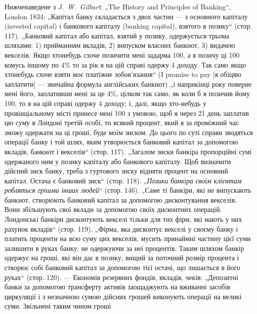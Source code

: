 Нижченаведене з \emph{J.~W.~Gilbart}: „The History and Principles of Banking“,
London 1834: „Капітал банку складається з двох частин — з основного капіталу
(invested capital) і банкового капіталу (banking capital), взятого в позику“ (стор. 117).
„Банковий капітал або капітал, взятий у позику, одержується трьома шляхами:
1) прийманням вкладів, 2) випуском власних банкнот, 3) видачею векселів. Якщо
хтонебудь схоче позичити мені задарма 100, а я позичу ці
100 комусь іншому по 4\% то за рік я на цій справі одержу
4 доходу. Так само якщо хтонебудь схоче взяти моє платіжне
зобов’язання“ (I promise to pay [я обіцяю заплатити] — звичайна формула англійських банкнот) „і
наприкінці року поверне мені його, заплативши мені за це 4\%, цілком так само, як коли б я позичив
йому 100, то я на цій справі одержу 4 доходу; і, далі, якщо
хто-небудь у провінціальному місті принесе мені 100 з умовою, щоб я через 21 день
заплатив цю суму в Лондоні третій особі, то всякий процент, який я за проміжний час зможу одержати
на ці гроші, буде моїм зиском. До цього по суті справи зводяться операції банку і той шлях, яким
утворюється банковий капітал за допомогою вкладів, банкнот і векселів“ (стор. 117). „Загалом зиски
банкіра пропорційні сумі одержаного ним у позику капіталу або банкового капіталу. Щоб визначити
дійсний зиск банку, треба з гуртового зиску відняти процент на основний капітал. Остача є банковий
зиск“ (стор. 118). „\emph{Позики банкіра своїм клієнтам робляться грішми інших людей}“ (стор. 146). „Саме
ті банкіри, які не випускають банкнот, створюють банковий капітал за допомогою дисконтування
векселів. Вони збільшують свої вклади за допомогою своїх дисконтних операцій. Лондонські банкіри
дисконтують векселі тільки для тих фірм, які мають у них рахунок вкладів“ (стор. 119). „Фірма, яка
дисконтує векселі у своєму банку і платить проценти на всю суму цих векселів, мусить принаймні
частину цієї суми залишити
в руках банку, не одержуючи за неї процентів. Таким шляхом банкір одержує на гроші, які він дає в
позику, вищий за поточний розмір процента і
створює собі банковий капітал за допомогою тієї остачі, що лишається в його руках“ (стор. 120). —
Економія резервних фондів, вкладів, чеків: „Депозитні банки за
допомогою трансферту активів заощаджують на вживанні засобів циркуляції і з
незначною сумою дійсних грошей виконують операції на великі суми. Звільнені таким чином гроші
